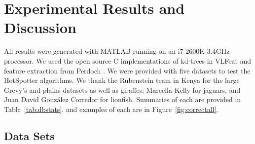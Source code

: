 
\section{Experimental Results and Discussion}

All results were generated with MATLAB running on an i7-2600K 3.4GHz processor.
We used the open source C implementations of kd-trees in VLFeat \cite{picm10VedaldiVLFEAT} and feature extraction from Perdoch{} \cite{cvpr09PerdochEfficRep}.
We were provided with five datasets to test the HotSpotter algorithms.
We thank the Rubenstein team in Kenya for the large Grevy's and plains datasets as well as giraffes; Marcella Kelly for jaguars, and Juan David Gonz\'{a}lez Corredor for lionfish.
Summaries of each are provided in Table~\ref{tab:dbstats}, and examples of each are in Figure~\ref{fig:correctall}.

\subsection{Data Sets}

\newlength{\correctmatchheight}
\setlength{\correctmatchheight}{1.65in}

